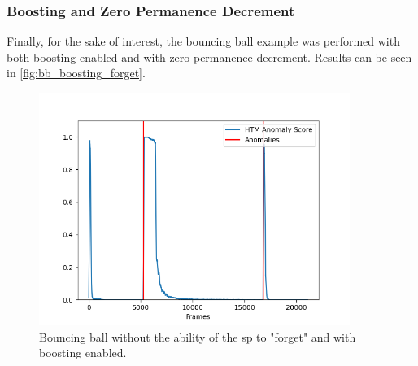 \subsubsection{Boosting and Zero Permanence Decrement}
Finally, for the sake of interest, the bouncing ball example was performed with both boosting enabled and with zero permanence decrement. Results can be seen in \autoref{fig:bb_boosting_forget}.
\begin{figure}[H]
    \centering
    \includegraphics[width=0.9\textwidth]{resources/experiments/bouncing_ball/bb_anoms_unforgetting_boosting.png}
    \caption[Bouncing Ball Experiment Anomaly Score No Boosting Zero Decrement]{Bouncing ball without the ability of the \gls*{sp} to "forget" and with boosting enabled.}
    \label{fig:bb_boosting_forget}
\end{figure}
